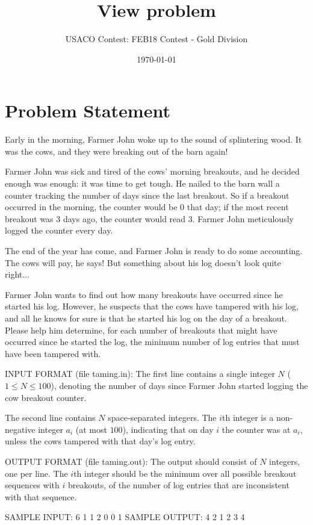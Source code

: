 \documentclass[12pt]{article}
\title{View problem}
\author{USACO Contest: FEB18 Contest - Gold Division}
\date{\today}
\begin{document}
\maketitle

\section*{Problem Statement}

Early in the morning, Farmer John woke up to the sound of splintering wood. It
was the cows, and they were breaking out of the barn again!

Farmer John was sick and tired of the cows' morning breakouts, and he decided
enough was enough: it was time to get tough. He nailed to the barn wall a
counter tracking the number of days since the last breakout. So if a breakout
occurred in the morning, the counter would be $0$ that day; if the most recent
breakout was $3$ days ago, the counter would read $3$. Farmer John meticulously
logged the counter every day.

The end of the year has come, and Farmer John is ready to do some accounting.
The cows will pay, he says! But something about his log doesn't look quite
right...  

Farmer John wants to find out how many breakouts have occurred since he started
his log. However, he suspects that the cows have tampered with his log, and all
he knows for sure is that he started his log on the day of a breakout. Please
help him determine, for each number of breakouts that might have occurred since
he started the log, the minimum number of log entries that must have been
tampered with.

INPUT FORMAT (file taming.in):
The first line contains a single integer $N$ ($1 \leq N \leq 100$), denoting the
number of days since Farmer John started logging the cow breakout counter.

The second line contains $N$ space-separated integers. The $i$th integer is a
non-negative integer $a_i$ (at most $100$), indicating that on day $i$ the
counter was at $a_i$, unless the cows tampered with that day's log entry.

OUTPUT FORMAT (file taming.out):
The output should consist of $N$ integers, one per line. The $i$th
integer should be the minimum over all possible breakout sequences with $i$
breakouts, of the number of log entries that are inconsistent with that
sequence.

SAMPLE INPUT:
6
1 1 2 0 0 1
SAMPLE OUTPUT: 
4
2
1
2
3
4
\end{document}
